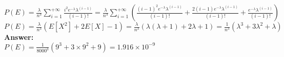 \documentclass{article}
\newcommand{\myansw}{\textbf{Answer:}\\}
\begin{document}
\begin{enumerate}
\begin{enumerate}
		${P(E) = \frac{\lambda}{n^3}\sum\limits_{i=1}^{+\infty}\frac{i^2e^{-\lambda}\lambda^{(i-1)}}{(i-1)!}=\frac{\lambda}{n^3}\sum\limits_{i=1}^{+\infty}(\frac{(i-1)^2e^{-\lambda}\lambda^{(i-1)}}{(i-1)!}+\frac{2(i-1)e^{-\lambda}\lambda^{(i-1)}}{(i-1)!}+\frac{e^{-\lambda}\lambda^{(i-1)}}{(i-1)!})}$\\
		${P(E) = \frac{\lambda}{n^3}(E[X^2] + 2E[X]-1)=\frac{\lambda}{n^3}(\lambda(\lambda+1) + 2\lambda+1)=\frac{1}{n^3}(\lambda^3+3\lambda^2+\lambda)}$\\
		\myansw
		${P(E) = \frac{1}{8000^3}(9^3+3\times 9^2+9)=1.916 \times 10^{-9}}$
		
	\end{enumerate}

\end{enumerate}

\newpage
\end{document}
